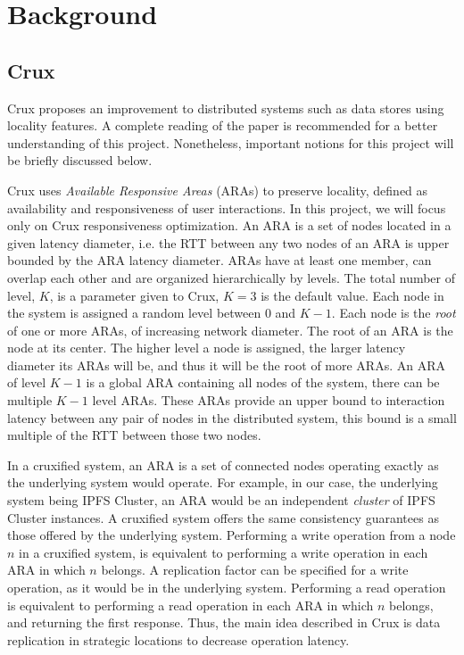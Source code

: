 \documentclass[a4paper,11pt,oneside]{report}
\begin{document}
\chapter{Background}

\section{Crux}

Crux \cite{crux} proposes an improvement to distributed systems such as data stores using locality features.
A complete reading of the paper is recommended for a better understanding of this project. Nonetheless, important notions for this project will be briefly discussed below.

Crux uses \textit{Available Responsive Areas} (ARAs) to preserve locality, defined as availability and responsiveness of user interactions. In this project, we will focus only on Crux responsiveness optimization. An ARA is a set of nodes located in a given latency diameter, i.e. the RTT between any two nodes of an ARA is upper bounded by the ARA latency diameter.
ARAs have at least one member, can overlap each other and are organized hierarchically by levels. The total number of level, $K$, is a parameter given to Crux, $K=3$ is the default value. Each node in the system is assigned a random level between $0$ and $K-1$. Each node is the \textit{root} of one or more ARAs,  of increasing network diameter. The root of an ARA is the node at its center. The higher level a node is assigned, the larger latency diameter its ARAs will be, and thus it will be the root of more ARAs. An ARA of level $K-1$ is a global ARA containing all nodes of the system, there can be multiple $K-1$ level ARAs. These ARAs provide an upper bound to interaction latency between any pair of nodes in the distributed system, this bound is a small multiple of the RTT between those two nodes.

In a cruxified system, an ARA is a set of connected nodes operating exactly as the underlying system would operate. For example, in our case, the underlying system being IPFS Cluster, an ARA would be an independent \textit{cluster} of IPFS Cluster instances. A cruxified system offers the same consistency guarantees as those offered by the underlying system.
Performing a write operation from a node $n$ in a cruxified system, is equivalent to performing a write operation in each ARA in which $n$ belongs. A replication factor can be specified for a write operation, as it would be in the underlying system. Performing a read operation is equivalent to performing a read operation in each ARA in which $n$ belongs, and returning the first response. Thus, the main idea described in Crux is data replication in strategic locations to decrease operation latency.
\end{document}

